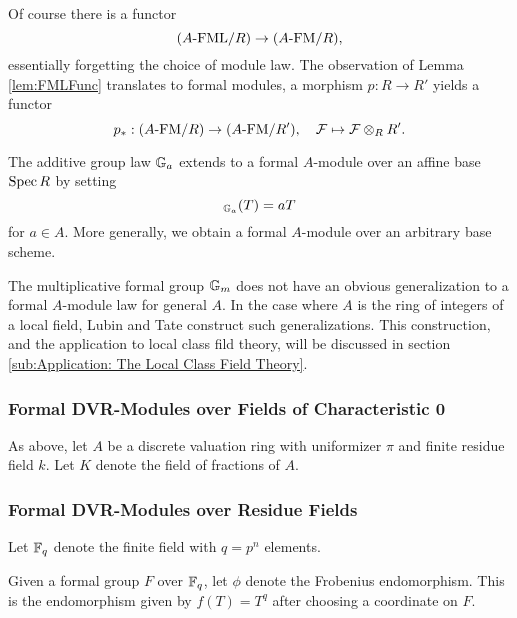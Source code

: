 \documentclass[../main.tex]{subfiles}
\begin{document}
Of course there is a functor 
\begin{equation*}
  {({A}\text-\mathrm{FML}/{R})} \to {({A}\text-\mathrm{FM}/{R})},
\end{equation*}
essentially forgetting the choice of module law. The observation of Lemma 
\ref{lem:FMLFunc} translates to formal modules, a morphism $p : R \to R'$ 
yields a functor 
\begin{equation*}
  p_*: {({A}\text-\mathrm{FM}/{R})} \to {({A}\text-\mathrm{FM}/{R'})}, \quad \mathcal{F} \mapsto \mathcal{F} \otimes_R R'.
\end{equation*}

\begin{xpl}
  The additive group law $\mathbb{G}_a$ extends to a formal $A$-module over an affine base
  $\operatorname{Spec} R$ by setting 
  \begin{equation*}
    [a]_{\GG_a}(T) = aT
  \end{equation*}
  for $a \in A$. More generally, we obtain a formal $A$-module over an arbitrary base
  scheme.

  The multiplicative formal group $\mathbb{G}_m$ does not have an obvious 
  generalization to a formal $A$-module law for general $A$. In the case where $A$
  is the ring of integers of a local field, Lubin and Tate \cite{LubinTateFormalMult} 
  construct such generalizations. This construction, and the application to local
  class fild theory, will be discussed in section \ref{sub:Application: The
  Local Class Field Theory}.
\end{xpl}

\subsubsection{Formal DVR-Modules over Fields of Characteristic 0} %
\label{ssub:Formal DVR-Modules over Fields of Characteristic 0}
As above, let $A$ be a discrete valuation ring with uniformizer $\pi$ and finite 
residue field $k$. Let $K$ denote the field of fractions of $A$.

\subsubsection{Formal DVR-Modules over Residue Fields}
Let $\mathbb{F}_q$ denote the finite field with $q = p^n$ elements.
\begin{defi}[Frobenius]
  Given a formal group $F$ over $\mathbb{F}_q$, let $\phi$ denote the Frobenius
  endomorphism. This is the endomorphism given by $f(T) = T^q$ after choosing
  a coordinate on $F$.
\end{defi}
\end{document}
